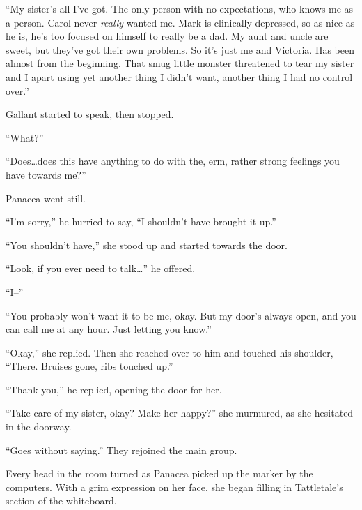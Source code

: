 ``My sister's all I've got.  The only person with no expectations, who knows me as a person.  Carol never \emph{really} wanted me.  Mark is clinically depressed, so as nice as he is, he's too focused on himself to really be a dad.  My aunt and uncle are sweet, but they've got their own problems.  So it's just me and Victoria.  Has been almost from the beginning.  That smug little monster threatened to tear my sister and I apart using yet another thing I didn't want, another thing I had no control over.''



Gallant started to speak, then stopped.



``What?''



``Does\ldots does this have anything to do with the, erm, rather strong feelings you have towards me?''



Panacea went still.



``I'm sorry,'' he hurried to say, ``I shouldn't have brought it up.''



``You shouldn't have,'' she stood up and started towards the door.



``Look, if you ever need to talk\ldots'' he offered.



``I--''



``You probably won't want it to be me, okay.  But my door's always open, and you can call me at any hour.  Just letting you know.''



``Okay,'' she replied.  Then she reached over to him and touched his shoulder, ``There.  Bruises gone, ribs touched up.''



``Thank you,'' he replied, opening the door for her.



``Take care of my sister, okay?  Make her happy?'' she murmured, as she hesitated in the doorway.



``Goes without saying.'' They rejoined the main group.



Every head in the room turned as Panacea picked up the marker by the computers.  With a grim expression on her face, she began filling in Tattletale's section of the whiteboard.





